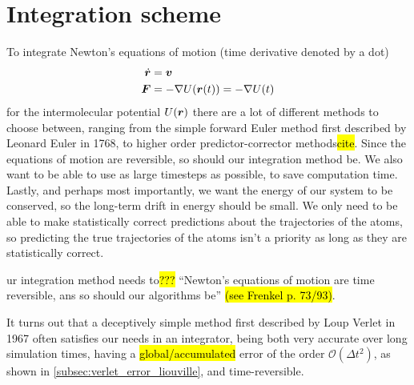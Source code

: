 \section{Integration scheme}
To integrate Newton's equations of motion (time derivative denoted by a dot)
\begin{align*}
    \dot {\boldsymbol{r}} &= \boldsymbol{v} \\
    \boldsymbol{F} &= -\nabla U(\boldsymbol{r}(t)) = -\nabla U(t)
\end{align*}
for the intermolecular potential $U(\boldsymbol{r})$ there are a lot of different methods to choose between, ranging from the simple forward Euler method first described by Leonard Euler in 1768, to higher order predictor-corrector methods\hl{cite}. Since the equations of motion are reversible, so should our integration method be. We also want to be able to use as large timesteps as possible, to save computation time. Lastly, and perhaps most importantly, we want the energy of our system to be conserved, so the long-term drift in energy should be small. We only need to be able to make statistically correct predictions about the trajectories of the atoms, so predicting the true trajectories of the atoms isn't a priority as long as they are statistically correct.

ur integration method needs to\hl{???} ``Newton's equations of motion are time reversible, ans so should our algorithms be'' \hl{(see Frenkel p. 73/93)}.

It turns out that a deceptively simple method first described by Loup Verlet in 1967\cite{verlet1967computer} often satisfies our needs in an integrator, being both very accurate over long simulation times, having a \hl{global/accumulated} error of the order $\mathcal{O}(\Delta t^2)$, as shown in \cref{subsec:verlet_error_liouville}, and time-reversible. 

